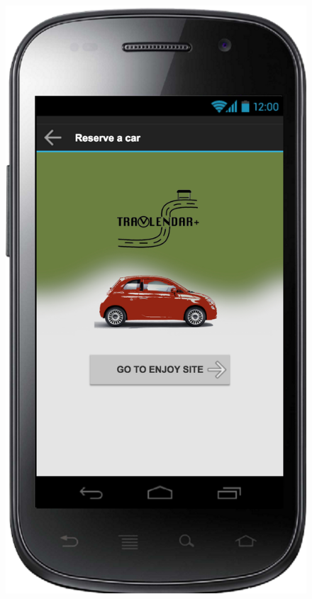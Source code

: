\documentclass[a4paper,leqno]{article}
\begin{document}
\newpage
\begin{figure}
	\begin{minipage}[!h]{0.45\linewidth}
		\centering
		\includegraphics[scale=0.15]{reserveCar}
	\end{minipage}
	\hspace{0.5cm}

\end{figure}
\end{document}
